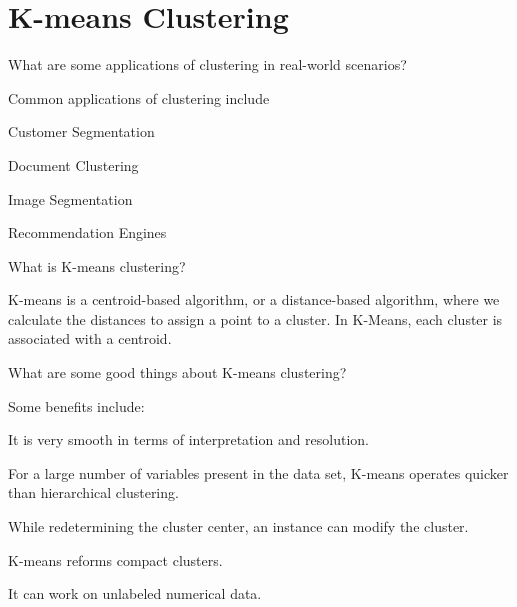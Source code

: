	\chapter{K-means Clustering}

	\resetquestioncounter{}
	\begin{qanda}
		\begin{question}
What are some applications of clustering in real-world scenarios?
		\end{question}

		\begin{answer}
Common applications of clustering include
	\begin{bulletedlist}
		\item Customer Segmentation
		\item Document Clustering
		\item Image Segmentation
		\item Recommendation Engines\end{bulletedlist}\end{answer}\end{qanda}
	\begin{qanda}
		\begin{question}
What is K-means clustering?
		\end{question}

		\begin{answer}
K-means is a centroid-based algorithm, or a distance-based algorithm, where we calculate the distances to assign a point to a cluster. In K-Means, each cluster is associated with a centroid.
		\end{answer}
	\end{qanda}

	\begin{qanda}
		\begin{question}
What are some good things about K-means clustering?
		\end{question}

		\begin{answer}
Some benefits include:
	\begin{bulletedlist}
		\item It is very smooth in terms of interpretation and resolution.
		\item For a large number of variables present in the data set, K-means operates quicker than hierarchical clustering.
		\item While redetermining the cluster center, an instance can modify the cluster.
		\item K-means reforms compact clusters.
		\item It can work on unlabeled numerical data.
	\end{bulletedlist}
		\end{answer}
	\end{qanda}

